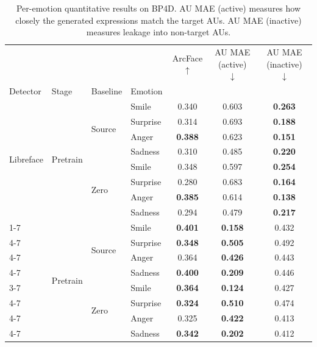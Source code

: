 \begin{table}[htb]
\caption{Per-emotion quantitative results on BP4D. AU MAE (active) measures how closely the generated expressions match the target \acp{AU}. AU MAE (inactive) measures leakage into non-target \acp{AU}.}
\label{tab:results-emotion-per-config-bp4d}
\begin{tabular}{llllccc}
\toprule
 &  &  &  & ArcFace $\uparrow$ & AU MAE (active) $\downarrow$ & AU MAE (inactive) $\downarrow$ \\
Detector & Stage & Baseline & Emotion &  &  &  \\
\midrule
\multirow[t]{8}{*}{Libreface} & \multirow[t]{8}{*}{Pretrain} & \multirow[t]{4}{*}{Source} & Smile & 0.340 & 0.603 & \textbf{0.263} \\
\cmidrule{4-7}
 &  &  & Surprise & 0.314 & 0.693 & \textbf{0.188} \\
\cmidrule{4-7}
 &  &  & Anger & \textbf{0.388} & 0.623 & \textbf{0.151} \\
\cmidrule{4-7}
 &  &  & Sadness & 0.310 & 0.485 & \textbf{0.220} \\
\cmidrule{3-7}
 &  & \multirow[t]{4}{*}{Zero} & Smile & 0.348 & 0.597 & \textbf{0.254} \\
\cmidrule{4-7}
 &  &  & Surprise & 0.280 & 0.683 & \textbf{0.164} \\
\cmidrule{4-7}
 &  &  & Anger & \textbf{0.385} & 0.614 & \textbf{0.138} \\
\cmidrule{4-7}
 &  &  & Sadness & 0.294 & 0.479 & \textbf{0.217} \\
\cmidrule{1-7}
\multirow[t]{8}{*}{Pyfeat} & \multirow[t]{8}{*}{Pretrain} & \multirow[t]{4}{*}{Source} & Smile & \textbf{0.401} & \textbf{0.158} & 0.432 \\
\cmidrule{4-7}
 &  &  & Surprise & \textbf{0.348} & \textbf{0.505} & 0.492 \\
\cmidrule{4-7}
 &  &  & Anger & 0.364 & \textbf{0.426} & 0.443 \\
\cmidrule{4-7}
 &  &  & Sadness & \textbf{0.400} & \textbf{0.209} & 0.446 \\
\cmidrule{3-7}
 &  & \multirow[t]{4}{*}{Zero} & Smile & \textbf{0.364} & \textbf{0.124} & 0.427 \\
\cmidrule{4-7}
 &  &  & Surprise & \textbf{0.324} & \textbf{0.510} & 0.474 \\
\cmidrule{4-7}
 &  &  & Anger & 0.325 & \textbf{0.422} & 0.413 \\
\cmidrule{4-7}
 &  &  & Sadness & \textbf{0.342} & \textbf{0.202} & 0.412 \\
\bottomrule
\end{tabular}
\end{table}
